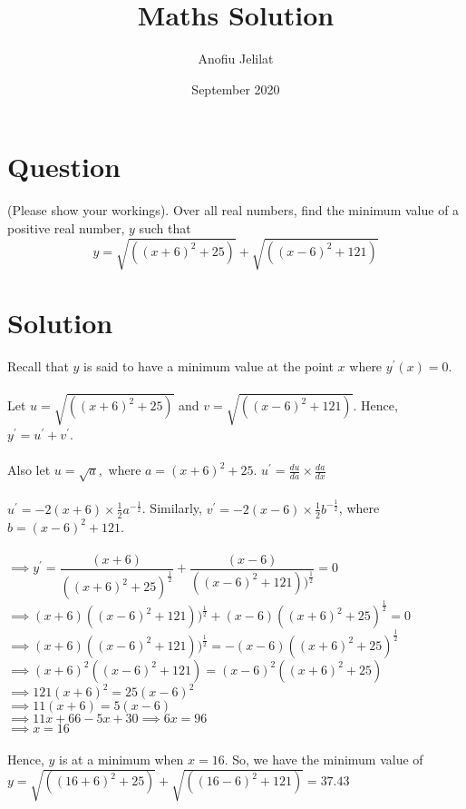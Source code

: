 \documentclass{article}
\title{Maths Solution}
\author{Anofiu Jelilat }
\date{September 2020}
\begin{document}
\maketitle

\section*{Question}
(Please show your workings). Over all real numbers, find the minimum value of a positive real number, $y$ such that
$$y = \sqrt{((x+6)^2 + 25)}+ \sqrt{((x-6)^2 + 121)}$$

\section*{Solution}
Recall that $y$ is said to have a minimum value at the point $x$ where $y^{'}(x) = 0$.\\\\
Let $u = \sqrt{((x+6)^2 + 25)}$ and $v = \sqrt{((x-6)^2 + 121)}$. Hence, $y^{'} = u^{'} + v^{'}$.\\\\
Also let $u = \sqrt{a},$ where $a = (x+6)^2 + 25$. $u^{'} = \frac{du}{da}\times \frac{da}{dx}$\\\\
$u^{'} = -2(x+6)\times \frac{1}{2}a^{-\frac{1}{2}} $. Similarly, $v^{'} = -2(x-6)\times \frac{1}{2}b^{-\frac{1}{2}} $, where $b = (x-6)^2 + 121$. \\\\
$\implies y^{'} = \dfrac{(x+6)}{((x+6)^{2}+25)^{\frac{1}{2}}} + \dfrac{(x-6)}{((x-6)^{2}+121))^{\frac{1}{2}}} = 0$\\
$\implies (x+6)((x-6)^{2}+121))^{\frac{1}{2}} + (x-6)((x+6)^{2}+25)^{\frac{1}{2}} = 0$\\
$\implies (x+6)((x-6)^{2}+121))^{\frac{1}{2}} = -(x-6)((x+6)^{2}+25)^{\frac{1}{2}}$\\
$\implies (x+6)^{2}((x-6)^{2}+121)= (x-6)^{2}((x+6)^{2}+25)$\\
$\implies 121(x+6)^{2}=25(x-6)^{2}$\\
$\implies 11(x+6)=5(x-6)$\\
$\implies 11x+66-5x+30 \implies 6x = 96$\\
$\implies x = 16$\\\\
Hence, $y$ is at a minimum when $x = 16$. So, we have the minimum value of $y = \sqrt{((16+6)^2 + 25)}+ \sqrt{((16-6)^2 + 121)}=37.43$
\end{document}
